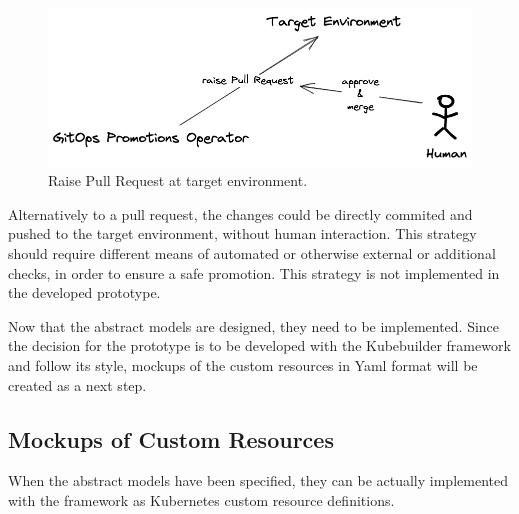 \begin{figure}[h]
	\centering
	\includegraphics[width=1.00\linewidth]{assets/raise-pull-request-and-approve.png}
	\caption{Raise Pull Request at target environment.
	}
	\label{fig:raise-pull-request-and-approve}	
\end{figure}

Alternatively to a pull request, the changes could be directly
commited and pushed to the target environment,
without human interaction. This strategy should require different means
of automated or otherwise external or additional checks, in order to ensure a safe promotion.
This strategy is not implemented in the developed prototype.

Now that the abstract models are designed,
they need to be implemented.
Since the decision for the prototype is to be developed
with the Kubebuilder framework and follow its style,
mockups of the custom resources in Yaml format
will be created as a next step.









\subsection{Mockups of Custom Resources}


When the abstract models have been specified,
they can be actually implemented with the framework
as Kubernetes custom resource definitions.

